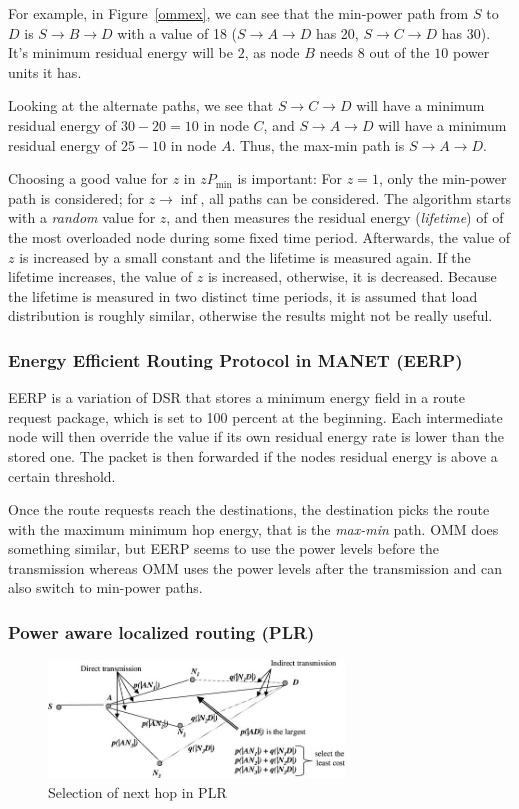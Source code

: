 For example, in Figure~\ref{ommex}, we can see that the min-power path from
$S$ to $D$ is $S \to B \to D$ with a value of 18 ($S \to A \to D$ has 20,
$S \to C \to D$ has 30).
It's minimum residual energy will be $2$, as node $B$ needs
$8$ out of the $10$ power units it has.

Looking at the alternate paths, we see that $S \to C \to D$ will have a
minimum residual energy of $30-20=10$ in node $C$, and $S \to A \to D$ will
have a minimum residual energy of $25-10$ in node $A$.
Thus, the max-min path is $S \to A \to D$.

Choosing a good value for $z$ in $zP_{\min}$ is important: For $z=1$, only
the min-power path is considered; for $z \to \inf$, all paths can be
considered. The algorithm starts with a \textit{random} value for $z$, and
then measures the residual energy (\textit{lifetime}) of of the most overloaded node during some
fixed time period. Afterwards, the value of $z$ is increased by a small constant
and the lifetime is measured again. If the lifetime increases, the value of $z$
is increased, otherwise, it is decreased. Because the lifetime is measured
in two distinct time periods, it is assumed that load distribution is roughly
similar, otherwise the results might not be really useful.


\subsubsection{Energy Efficient Routing Protocol in MANET (EERP)}
EERP\cite{main2} is a variation of DSR that stores a minimum energy field
in a route request package, which is set to 100 percent at the beginning. Each
intermediate node will then override the value if its own residual energy rate
is lower than the stored one. The packet is then forwarded if the nodes residual
energy is above a certain threshold.

Once the route requests reach the destinations, the destination picks the route
with the maximum minimum hop energy, that is the \textit{max-min} path. OMM
does something similar, but EERP seems to use the power
levels before the transmission whereas OMM uses the power levels after the
transmission and can also switch to min-power paths.

\subsubsection{Power aware localized routing (PLR)}
\begin{figure}
\centering
\includegraphics[width=0.7\textwidth]{images/plr-example}
\caption{Selection of next hop in PLR\cite{alotaibi2012survey}}
\label{plrexample}
\end{figure}

